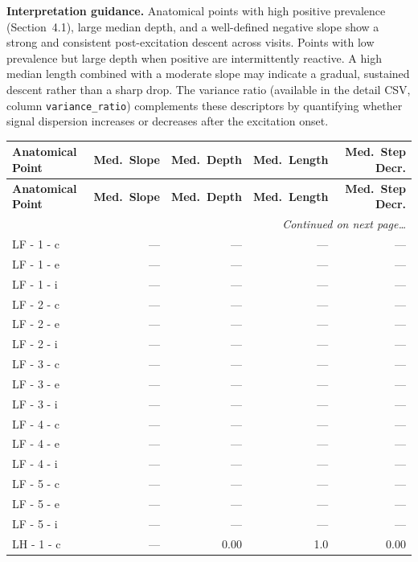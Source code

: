 \documentclass[a4paper,11pt]{article}
\begin{document}
\medskip
\noindent\textbf{Interpretation guidance.}
Anatomical points with high positive prevalence (Section~4.1), large median depth, and a
well-defined negative slope show a strong and consistent post-excitation descent across
visits.
Points with low prevalence but large depth when positive are intermittently reactive.
A high median length combined with a moderate slope may indicate a gradual, sustained
descent rather than a sharp drop.
The variance ratio (available in the detail CSV, column \texttt{variance\_ratio}) complements
these descriptors by quantifying whether signal dispersion increases or decreases after the
excitation onset.

\begin{small}
\begin{longtable}{p{4.5cm}rrrr}
\toprule
\textbf{Anatomical Point} &
\textbf{Med.\ Slope} &
\textbf{Med.\ Depth} &
\textbf{Med.\ Length} &
\textbf{Med.\ Step Decr.} \\
\midrule
\endfirsthead
\toprule
\textbf{Anatomical Point} &
\textbf{Med.\ Slope} &
\textbf{Med.\ Depth} &
\textbf{Med.\ Length} &
\textbf{Med.\ Step Decr.} \\
\midrule
\endhead
\midrule
\multicolumn{5}{r}{\small\emph{Continued on next page\ldots}} \\
\endfoot
\bottomrule
\endlastfoot
LF - 1 - c & --- & --- & --- & --- \\
LF - 1 - e & --- & --- & --- & --- \\
LF - 1 - i & --- & --- & --- & --- \\
LF - 2 - c & --- & --- & --- & --- \\
LF - 2 - e & --- & --- & --- & --- \\
LF - 2 - i & --- & --- & --- & --- \\
LF - 3 - c & --- & --- & --- & --- \\
LF - 3 - e & --- & --- & --- & --- \\
LF - 3 - i & --- & --- & --- & --- \\
LF - 4 - c & --- & --- & --- & --- \\
LF - 4 - e & --- & --- & --- & --- \\
LF - 4 - i & --- & --- & --- & --- \\
LF - 5 - c & --- & --- & --- & --- \\
LF - 5 - e & --- & --- & --- & --- \\
LF - 5 - i & --- & --- & --- & --- \\
LH - 1 - c & --- & 0.00 & 1.0 & 0.00 \\

\end{longtable}
\end{small}
\end{document}
